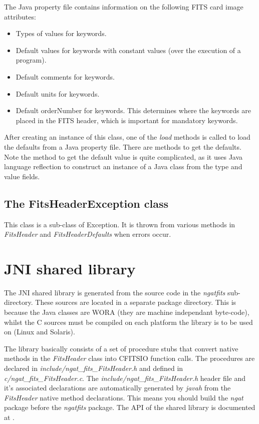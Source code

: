 \documentclass[10pt,a4paper]{article}
\begin{document}
The Java property file contains information on the following FITS card image attributes: 
\begin{itemize}
\item Types of values for keywords. 
\item Default values for keywords with constant values (over the execution of a program). 
\item Default comments for keywords. 
\item Default units for keywords. 
\item Default orderNumber for keywords. This determines where the keywords are placed in the FITS header, 
	which is important for mandatory keywords. 
\end{itemize}

After creating an instance of this class, one of the {\em load} methods is called to load the defaults from a 
Java property file. 
There are methods to get the defaults. Note the method to get the default value is quite complicated, as it
uses Java language reflection to construct an instance of a Java class from the type and value fields.

\subsection{The FitsHeaderException class}
This class is a sub-class of Exception. It is thrown from various methods in {\em FitsHeader} and
{\em FitsHeaderDefaults} when errors occur.

\section{JNI shared library}
The JNI shared library is generated from the source code in the {\em ngatfits} sub-directory. These sources are
located in a separate package directory. This is because the Java classes are WORA (they are machine independant 
byte-code), whilst the C sources must be compiled on each platform the library is to be used on (Linux and Solaris).

The library basically consists of a 
set of procedure stubs that convert native methods in the {\em FitsHeader} class into CFITSIO function calls.
The procedures are declared in {\em include/ngat\_fits\_FitsHeader.h} and defined in {\em c/ngat\_fits\_FitsHeader.c}.
The {\em include/ngat\_fits\_FitsHeader.h} header file and it's associated declarations are automatically 
generated by {\em javah} from the {\em FitsHeader} native method declarations. This means you should build
the {\em ngat} package before the {\em ngatfits} package.
The API of the shared library is documented at \cite{bib:ngatfitsjniapi}.
\end{document}
